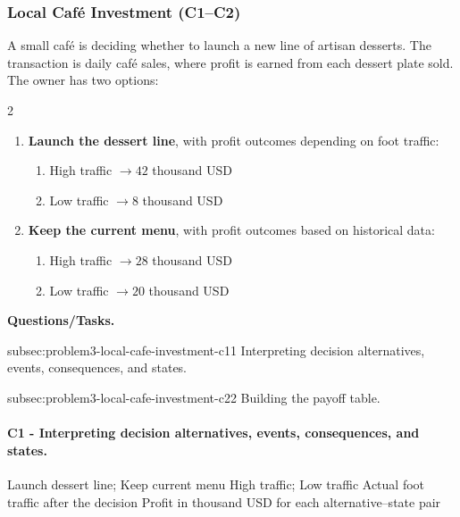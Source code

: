 	\subsubsection{Local Café Investment (C1--C2)}
	\label{sec:problem3-local-cafe-investment-c1-c2}
	A small café is deciding whether to launch a new line of artisan desserts. The transaction is daily café sales, where profit is earned from each dessert plate sold. The owner has two options:
	\begin{multicols}{2}
		\begin{enumerate}[label=\arabic*.]
			\item \textbf{Launch the dessert line}, with profit outcomes depending on foot traffic:
			\begin{enumerate}[label=\roman*)]
				\item High traffic $\to 42$ thousand USD
				\item Low traffic $\to 8$ thousand USD
			\end{enumerate}

			\columnbreak

			\item \textbf{Keep the current menu}, with profit outcomes based on historical data:
			\begin{enumerate}[label=\roman*)]
				\item High traffic $\to 28$ thousand USD
				\item Low traffic $\to 20$ thousand USD
			\end{enumerate}
		\end{enumerate}
	\end{multicols}

	\textbf{Questions/Tasks.}
	\begin{enumerate}
		\CriterionTask
		{subsec:problem3-local-cafe-investment-c1}{1}
		{Interpreting decision alternatives, events, consequences, and states.}

		\CriterionTask
		{subsec:problem3-local-cafe-investment-c2}{2}
		{Building the payoff table.}
	\end{enumerate}

	\paragraph*{C1 - Interpreting decision alternatives, events, consequences, and states.}
	\label{subsec:problem3-local-cafe-investment-c1}

	\DecisionElementsTable
	{Launch dessert line; Keep current menu}
	{High traffic; Low traffic}
	{Actual foot traffic after the decision}
	{Profit in thousand USD for each alternative--state pair}

